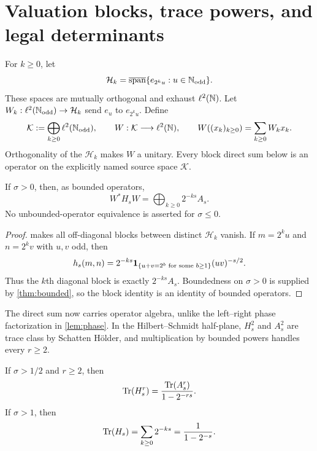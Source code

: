 \section{Valuation blocks, trace powers, and legal determinants}
\label{sec:blocks}

For $k\ge0$, let
\[
  \mathcal H_k
  =\overline{\operatorname{span}}\{e_{2^ku}:u\in\mathbb N_{\mathrm{odd}}\}.
\]
These spaces are mutually orthogonal and exhaust $\ell^2(\mathbb N)$.  Let
$W_k:\ell^2(\mathbb N_{\mathrm{odd}})\to\mathcal H_k$ send $e_u$ to $e_{2^ku}$.  Define
\[
  \mathcal K:=\bigoplus_{k\ge0}\ell^2(\mathbb N_{\mathrm{odd}}),
  \qquad
  W:\mathcal K\longrightarrow\ell^2(\mathbb N),
  \qquad
  W((x_k)_{k\ge0})=\sum_{k\ge0}W_kx_k.
\]
Orthogonality of the $\mathcal H_k$ makes $W$ a unitary.  Every block direct
sum below is an operator on the explicitly named source space $\mathcal K$.

\begin{theorem}
\label{thm:direct-sum}
If $\sigma>0$, then, as bounded operators,
\begin{equation}
  W^*H_sW=\bigoplus_{k\ge0}2^{-ks}A_s.
  \label{eq:direct-sum}
\end{equation}
No unbounded-operator equivalence is asserted for $\sigma\le0$.
\end{theorem}

\begin{proof}
 makes all off-diagonal blocks between distinct
$\mathcal H_k$ vanish.  If $m=2^ku$ and $n=2^kv$ with $u,v$ odd, then
\[
  h_s(m,n)
  =2^{-ks}\mathbf 1_{\{u+v=2^b\text{ for some }b\ge1\}}(uv)^{-s/2}.
\]
Thus the $k$th diagonal block is exactly $2^{-ks}A_s$.  Boundedness on
$\sigma>0$ is supplied by \cref{thm:bounded}, so the block identity is an
identity of bounded operators.
\end{proof}

The direct sum now carries operator algebra, unlike the left--right phase
factorization in \cref{lem:phase}.  In the Hilbert--Schmidt half-plane,
$H_s^2$ and $A_s^2$ are trace class by Schatten H\"older, and multiplication
by bounded powers handles every $r\ge2$.

\begin{proposition}
\label{prop:trace-powers}
If $\sigma>1/2$ and $r\ge2$, then
\begin{equation}
  \operatorname{Tr}(H_s^r)
  =\frac{\operatorname{Tr}(A_s^r)}{1-2^{-rs}}.
  \label{eq:trace-factor}
\end{equation}
If $\sigma>1$, then
\begin{equation}
  \operatorname{Tr}(H_s)=\sum_{k\ge0}2^{-ks}
  =\frac1{1-2^{-s}}.
  \label{eq:ordinary-trace}
\end{equation}
\end{proposition}

